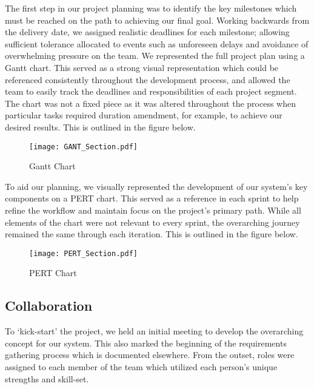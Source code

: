 \documentclass[11pt, english]{article}
\begin{document}
	The first step in our project planning was to identify the key milestones which must be reached on the path to achieving our final goal. Working backwards from the delivery date, we assigned realistic deadlines for each milestone; allowing sufficient tolerance allocated to events such as unforeseen delays and avoidance of overwhelming pressure on the team. We represented the full project plan using a Gantt chart. This served as a strong visual representation which could be referenced consistently throughout the development process, and allowed the team to easily track the deadlines and responsibilities of each project segment. The chart was not a fixed piece as it was altered throughout the process when particular tasks required duration amendment, for example, to achieve our desired results. This is outlined in the figure below.

	\begin{figure}[H]
	\begin{center}
		\texttt{[image: GANT\_Section.pdf]}
		\caption{Gantt Chart}
	\end{center}
	\end{figure}

	To aid our planning, we visually represented the development of our system's key components on a PERT chart. This served as a reference in each sprint to help refine the workflow and maintain focus on the project's primary path. While all elements of the chart were not relevant to every sprint, the overarching journey remained the same through each iteration. This is outlined in the figure below.

	\begin{figure}[H]
	\begin{center}
		\texttt{[image: PERT\_Section.pdf]}
		\caption{PERT Chart}
	\end{center}
	\end{figure}

	\subsection{Collaboration}

	To `kick-start' the project, we held an initial meeting to develop the overarching concept for our system. This also marked the beginning of the requirements gathering process which is documented elsewhere. From the outset, roles were assigned to each member of the team which utilized each person's unique strengths and skill-set.\\
\end{document}
